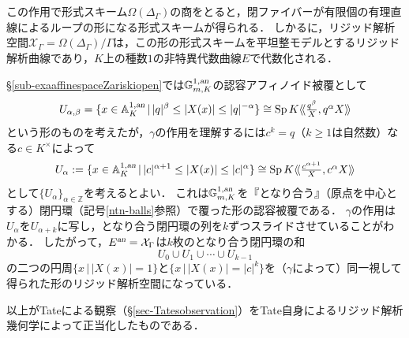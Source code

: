 \documentclass[a4paper,12pt, dvipdfmx]{jsbook}
\def\Z{\mathbb{Z}}
\def\G{\mathbb{G}}
\def\A{\mathbb{A}}
\def\Sp{\mathop{\mathrm{Sp}}\nolimits}
\def\an{\textsl{an}}
\def\dl{\langle\!\langle}
\def\dr{\rangle\!\rangle}
\newcommand{\abs}[1]{\lvert#1\rvert}
\theoremstyle{plain}
\theoremstyle{definition}
\renewcommand{\theexer}{\arabic{chapter}.\arabic{exer}}
\renewcommand{\thesection}{\arabic{chapter}.\arabic{section}}
\renewcommand{\thesubsection}{\arabic{chapter}.\arabic{section}.\,(\alph{subsection})}
\renewcommand{\thesubsubsection}{\thesubsection.\,(\alph{subsubsection})}
\begin{document}
この作用で形式スキーム$\widehat{\Omega}(\Delta_{\Gamma})$の商をとると，閉ファイバーが有限個の有理直線によるループの形になる形式スキームが得られる．
しかるに，リジッド解析空間$\mathcal{X}_{\Gamma}=\Omega(\Delta_{\Gamma})/\Gamma$は，この形の形式スキームを平坦整モデルとするリジッド解析曲線であり，$K$上の種数$1$の非特異代数曲線$E$で代数化される．

\S\ref{sub-exaaffinespaceZariskiopen}では$\G_{m,K}^{1,\an}$の認容アフィノイド被覆として
$$
U_{\alpha,\beta}=\{x\in\A^{1,\an}_K\,|\,\abs{q}^{\beta}\leq\abs{X(x)}\leq\abs{q}^{-\alpha}\}\cong\Sp K\dl {\textstyle \frac{q^{\beta}}{X},q^{\alpha}X}\dr
$$
という形のものを考えたが，$\gamma$の作用を理解するには$c^k=q$（$k\geq 1$は自然数）なる$c\in K^{\times}$によって
$$
U_{\alpha}:=\{x\in\A^{1,\an}_K\,|\,\abs{c}^{\alpha+1}\leq\abs{X(x)}\leq\abs{c}^{\alpha}\}\cong\Sp K\dl {\textstyle \frac{c^{\alpha+1}}{X},c^{\alpha}X}\dr
$$
として$\{U_{\alpha}\}_{\alpha\in\Z}$を考えるとよい．
これは$\G_{m,K}^{1,\an}$を『となり合う』（原点を中心とする）閉円環（記号\ref{ntn-balls}参照）で覆った形の認容被覆である．
$\gamma$の作用は$U_{\alpha}$を$U_{\alpha+k}$に写し，となり合う閉円環の列を$k$ずつスライドさせていることがわかる．
したがって，$E^{\an}=\mathcal{X}_{\Gamma}$は$k$枚のとなり合う閉円環の和
$$
U_0\cup U_1\cup\cdots\cup U_{k-1}
$$
の二つの円周$\{x\,|\,\abs{X(x)}=1\}$と$\{x\,|\,\abs{X(x)}=\abs{c}^k\}$を（$\gamma$によって）同一視して得られた形のリジッド解析空間になっている．

以上がTateによる観察（\S\ref{sec-Tatesobservation}）をTate自身によるリジッド解析幾何学によって正当化したものである．










\appendix
\renewcommand{\thesection}{\Alph{chapter}.\arabic{section}}
\renewcommand{\theexer}{\Alph{chapter}.\arabic{exer}}
\renewcommand{\thesubsection}{\Alph{chapter}.\arabic{section}.\,(\alph{subsection})}
\renewcommand{\thesubsubsection}{\thesubsection.\,(\alph{subsubsection})}
\end{document}

